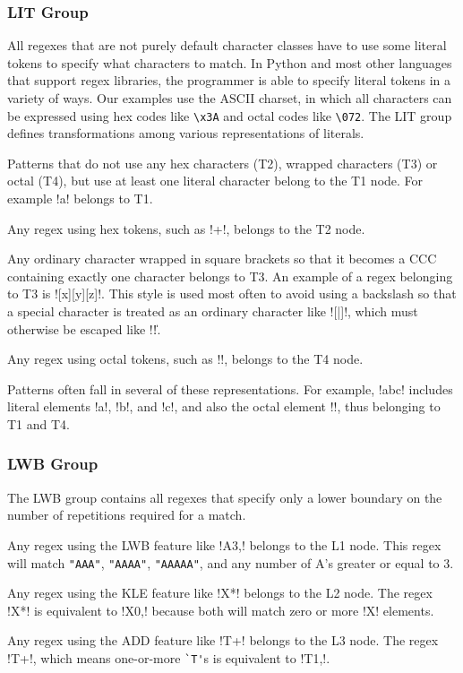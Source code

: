 \subsubsection{LIT Group}
All regexes that are not purely default character classes have to use some literal tokens to specify what characters to match.  In Python and most other languages that support regex libraries, the programmer is able to specify literal tokens in a variety of ways.  Our examples use the ASCII charset, in which all characters can be expressed using hex codes like \verb!\x3A! and octal codes like \verb!\072!.  The LIT group defines transformations among various representations of literals.

\begin{description}  \itemsep -1pt
\item[T1:] Patterns that do not use any hex characters (T2), wrapped characters (T3) or octal (T4), but use at least one literal character belong to the T1 node.  For example \cverb!a! belongs to T1.
\item[T2:] Any regex using hex tokens, such as \cverb!+!, belongs to the T2 node.
\item[T3:]  Any ordinary character wrapped in square brackets so that it becomes a CCC containing exactly one character belongs to T3.
An example of a regex belonging to T3 is \cverb![x][y][z]!. This style is used most often to avoid using a backslash so that a special character is treated as an ordinary character like \cverb![|]!, which must otherwise be escaped like \cverb!\|!.
\item[T4:] Any regex using octal tokens, such as \cverb!!, belongs to the T4 node.
\end{description}

Patterns often fall in several of these representations.  For example, \cverb!abc! includes literal elements \cverb!a!, \cverb!b!, and \cverb!c!, and also the octal element \cverb!!, thus belonging to T1 and T4.

\subsubsection{LWB Group}
The LWB group contains all regexes that specify only a lower boundary on the number of repetitions required for a match.

\begin{description}  \itemsep -1pt
\item[L1:] Any regex using the LWB feature like \cverb!A{3,}! belongs to the L1 node.  This regex will match \verb!"AAA"!, \verb!"AAAA"!, \verb!"AAAAA"!, and any number of A's greater or equal to 3.
\item[L2:] Any regex using the KLE feature like \cverb!X*! belongs to the L2 node. The regex \cverb!X*! is equivalent to \cverb!X{0,}! because both will match zero or more \cverb!X! elements.
\item[L3:] Any regex using the ADD feature like \cverb!T+! belongs to the L3 node. The regex \cverb!T+!, which means one-or-more \verb!`T'!s is equivalent to \cverb!T{1,}!.
\end{description}

